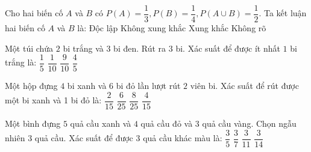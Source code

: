 \begin{ex}
Cho hai biến cố $A$ và $B$ có $P(A)=\dfrac{1}{3},P(B)=\dfrac{1}{4},P(A\cup B)=\dfrac{1}{2}$. Ta kết luận hai biến cố $A$ và $B$ là:
\choice
{Độc lập}
{\True Không xung khắc}
{Xung khắc}
{Không rõ}
\end{ex}
\begin{ex}
Một túi chứa $2$ bi trắng và $3$ bi đen. Rút ra $3$ bi. Xác suất để được ít nhất $1$ bi trắng là:
\choice
{$\dfrac{1}{5}$}
{$\dfrac{1}{10}$}
{\True $\dfrac{9}{10}$}
{$\dfrac{4}{5}$}
\end{ex}
\begin{ex}
Một hộp đựng $4$ bi xanh và $6$ bi đỏ lần lượt rút $2$ viên bi. Xác suất để rút được một bi xanh và 1 bi đỏ là:
\choice
{$\dfrac{2}{15}$}
{$\dfrac{6}{25}$}
{$\dfrac{8}{25}$}
{\True $\dfrac{4}{15}$}
\end{ex}
\begin{ex}
Một bình đựng $5$ quả cầu xanh và $4$ quả cầu đỏ và $3$ quả cầu vàng. Chọn ngẫu nhiên $3$ quả cầu. Xác suất để được $3$ quả cầu khác màu là:
\choice
{$\dfrac{3}{5}$}
{$\dfrac{3}{7}$}
{\True $\dfrac{3}{11}$}
{$\dfrac{3}{14}$}
\end{ex}

